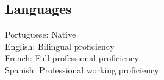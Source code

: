 \documentclass[letterpaper]{deedy-resume} %
\begin{document}
\begin{minipage}[t]{0.33\textwidth}
\sectionspace %

\subsection{Languages}

Portuguese: Native \\
English: Bilingual proficiency \\
French: Full professional proficiency \\
Spanish: Professional working proficiency \\

\sectionspace %


\end{minipage} %
\hfill
%
%
\end{document}
